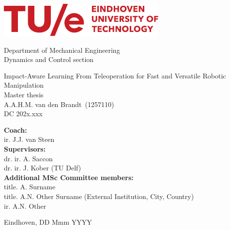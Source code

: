 \documentclass[11pt]{report}
\numberwithin{equation}{chapter}		%
\numberwithin{figure}{chapter}			%
\numberwithin{table}{chapter}			%
\newcommand{\deltitle}{Impact-Aware Learning From Teleoperation for Fast and Versatile Robotic Manipulation}        %
\newcommand{\StudentName}{A.A.H.M. van den Brandt}               %
\newcommand{\StudentID}{1257110}                    %
\newcommand{\DCcode}{202x.xxx}                      %
\begin{document}
	\hypersetup{pageanchor=false}
	\begin{titlepage}
	\centering
	\includegraphics[scale=1.9]{Graphics/TUE-logo.pdf}\\[0mm]
	\begin{center}
		{\Large Department of Mechanical Engineering}\\[2mm]
		{\Large Dynamics and Control section}\\[20mm]
	\end{center}

	\begin{center}
		{\Huge \deltitle}\\[2mm]
		{\Large Master thesis}\\[2mm]
		{\large \StudentName \ (\StudentID)}\\[1mm]
		{\large DC \DCcode}\\[70mm]
	\end{center}
		
	\flushleft\large {\textbf{Coach:}} \\
	{ir. J.J. van Steen}   \\    


	\flushleft\large {\textbf{Supervisors:}} \\
	{dr. ir. A. Saccon}             \\
	{dr. ir. J. Kober (TU Delf)}             \\

	\flushleft\large {\textbf{Additional MSc Committee members:}} \\
	{title. A. Surname}  \\  
	{title. A.N. Other Surname (External Institution, City, Country)}  \\  %
	{ir. A.N. Other}                 

	\vfill\center Eindhoven, DD Mmm YYYY \\ %
		
	\end{titlepage}
\end{document}
